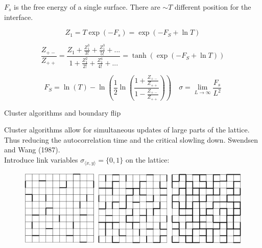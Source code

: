 \documentclass[12pt,handout]{beamer}
\begin{document}
\begin{frame}
\begin{center}

$F_s$ is the free energy of a single surface. There are $\sim T$ different position for the interface.

\[Z_1 = T \exp \left( - F_s \right) = \exp \left( -F_S +\ln T \right) \]

\[ \frac{Z_{+-}}{Z_{++}} = \frac{Z_1 + \frac{Z_1^3}{3!} + \frac{Z_1^3}{5!} + ...}{1 +  \frac{Z_1^2}{2!} + \frac{Z_1^4}{4!} + ...} = \tanh \left( \exp \left( -F_S +\ln T \right) \right) \]

\[
F_S = \ln \left( T \right) - \ln \left( \frac{1}{2} \ln \left( \frac{1 + \frac{Z_{+-}}{Z_{++}}}{1 - \frac{Z_{+-}}{Z_{++}}} \right) \right) \quad \sigma = \lim_{L \rightarrow \infty} \frac{F_s}{L^2} \]


\end{center}
\end{frame}

\begin{frame}{Cluster algorithms and boundary flip}
\begin{center}

Cluster algorithms allow for simultaneous updates of large parts of the lattice. Thus reducing the autocorrelation time and the critical slowling down. Swendsen and Wang (1987).\\
\vspace{10pt}
Introduce link variables $\sigma_{\langle x, y \rangle} = \lbrace 0, 1 \rbrace$ on the lattice:

\begin{figure}[!htb]
\centering
\includegraphics[scale=0.4]{link.png}
\end{figure}


\end{center}
\end{frame}
\end{document}
